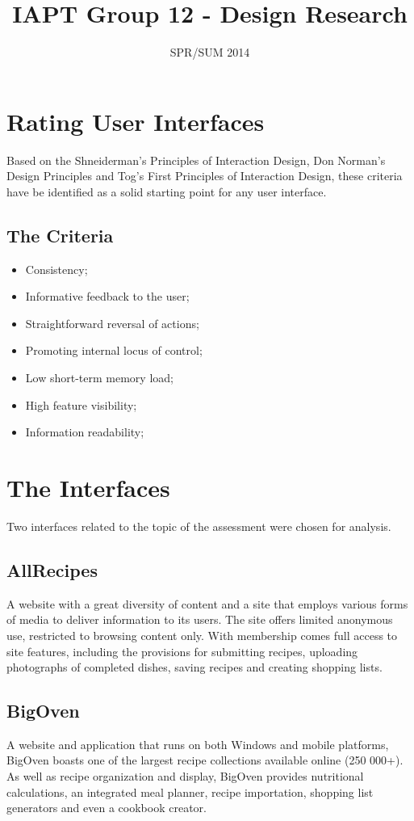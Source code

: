 \documentclass{article}
\title{IAPT Group 12 - Design Research}
\date{SPR/SUM 2014}
\begin{document}
\maketitle
\clearpage

\section*{Rating User Interfaces}
Based on the Shneiderman's Principles of Interaction Design, Don Norman's Design Principles and Tog's First Principles of Interaction Design, these criteria have be identified as a solid starting point for any user interface.

\subsection*{The Criteria}
\begin{itemize}
\item Consistency;
\item Informative feedback to the user;
\item Straightforward reversal of actions;
\item Promoting internal locus of control;
\item Low short-term memory load;
\item High feature visibility;
\item Information readability;
\end{itemize}

\clearpage

\section*{The Interfaces}
Two interfaces related to the topic of the assessment were chosen for analysis.

\subsection*{AllRecipes}
A website with a great diversity of content and a site that employs various forms 
of media to deliver information to its users. The site offers limited anonymous
use, restricted to browsing content only. With membership comes full access to 
site features, including the provisions for submitting recipes, uploading
photographs of completed dishes, saving recipes and creating shopping lists.

\subsection*{BigOven}
A website and application that runs on both Windows and mobile platforms, BigOven
boasts one of the largest recipe collections available online (250 000+). As well
as recipe organization and display, BigOven provides nutritional calculations,
an integrated meal planner, recipe importation, shopping list generators and even 
a cookbook creator.
\end{document}
